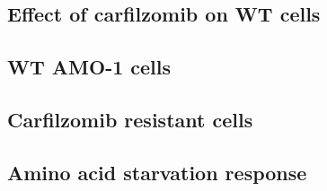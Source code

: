\subsection{Effect of carfilzomib on WT cells}

\subsection{WT AMO-1 cells}

\subsection{Carfilzomib resistant cells}


\subsection{Amino acid starvation response}



